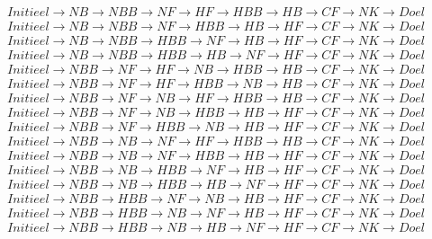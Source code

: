 \documentclass{article}
\begin{document}
\[\begin{array}{c}
Initieel \rightarrow NB \rightarrow NBB \rightarrow NF \rightarrow HF \rightarrow HBB \rightarrow HB \rightarrow CF \rightarrow NK \rightarrow Doel\\
Initieel \rightarrow NB \rightarrow NBB \rightarrow NF \rightarrow HBB \rightarrow HB \rightarrow HF \rightarrow CF \rightarrow NK \rightarrow Doel\\
Initieel \rightarrow NB \rightarrow NBB \rightarrow HBB \rightarrow NF \rightarrow HB \rightarrow HF \rightarrow CF \rightarrow NK \rightarrow Doel\\
Initieel \rightarrow NB \rightarrow NBB \rightarrow HBB \rightarrow HB \rightarrow NF \rightarrow HF \rightarrow CF \rightarrow NK \rightarrow Doel\\
Initieel \rightarrow NBB \rightarrow NF \rightarrow HF \rightarrow NB \rightarrow HBB \rightarrow HB \rightarrow CF \rightarrow NK \rightarrow Doel\\
Initieel \rightarrow NBB \rightarrow NF \rightarrow HF \rightarrow HBB \rightarrow NB \rightarrow HB \rightarrow CF \rightarrow NK \rightarrow Doel\\
Initieel \rightarrow NBB \rightarrow NF \rightarrow NB \rightarrow HF \rightarrow HBB \rightarrow HB \rightarrow CF \rightarrow NK \rightarrow Doel\\
Initieel \rightarrow NBB \rightarrow NF \rightarrow NB \rightarrow HBB \rightarrow HB \rightarrow HF \rightarrow CF \rightarrow NK \rightarrow Doel\\
Initieel \rightarrow NBB \rightarrow NF \rightarrow HBB \rightarrow NB \rightarrow HB \rightarrow HF \rightarrow CF \rightarrow NK \rightarrow Doel\\
Initieel \rightarrow NBB \rightarrow NB \rightarrow NF \rightarrow HF \rightarrow HBB \rightarrow HB \rightarrow CF \rightarrow NK \rightarrow Doel\\
Initieel \rightarrow NBB \rightarrow NB \rightarrow NF \rightarrow HBB \rightarrow HB \rightarrow HF \rightarrow CF \rightarrow NK \rightarrow Doel\\
Initieel \rightarrow NBB \rightarrow NB \rightarrow HBB \rightarrow NF \rightarrow HB \rightarrow HF \rightarrow CF \rightarrow NK \rightarrow Doel\\
Initieel \rightarrow NBB \rightarrow NB \rightarrow HBB \rightarrow HB \rightarrow NF \rightarrow HF \rightarrow CF \rightarrow NK \rightarrow Doel\\
Initieel \rightarrow NBB \rightarrow HBB \rightarrow NF \rightarrow NB \rightarrow HB \rightarrow HF \rightarrow CF \rightarrow NK \rightarrow Doel\\
Initieel \rightarrow NBB \rightarrow HBB \rightarrow NB \rightarrow NF \rightarrow HB \rightarrow HF \rightarrow CF \rightarrow NK \rightarrow Doel\\
Initieel \rightarrow NBB \rightarrow HBB \rightarrow NB \rightarrow HB \rightarrow NF \rightarrow HF \rightarrow CF \rightarrow NK \rightarrow Doel\\
\end{array}
\]
\end{document}
